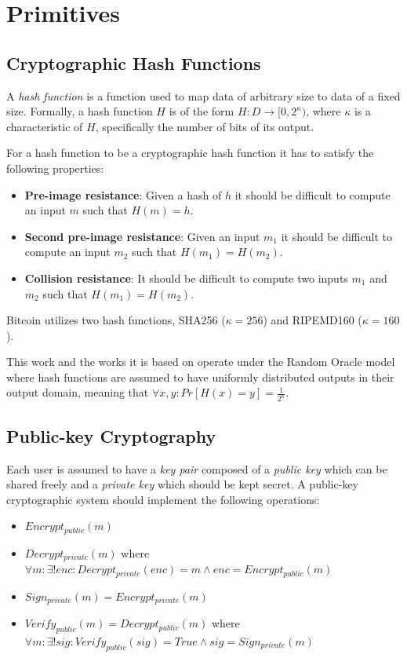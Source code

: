 \section{Primitives}
\subsection{Cryptographic Hash Functions}
A \textit{hash function} is a function used to map data of arbitrary size to data of a fixed size. Formally, a hash function $H$ is of the form $H: D \rightarrow [0, 2^\kappa)$, where $\kappa$ is a characteristic of $H$, specifically the number of bits of its output.

For a hash function to be a cryptographic hash function it has to satisfy the following properties:
\begin{itemize}
  \item \textbf{Pre-image resistance}: Given a hash of $h$ it should be difficult to compute an input $m$ such that $H(m) = h$.
  \item \textbf{Second pre-image resistance}: Given an input $m_1$ it should be difficult to compute an input $m_2$ such that $H(m_1) = H(m_2)$.
  \item \textbf{Collision resistance}: It should be difficult to compute two inputs $m_1$ and $m_2$ such that $H(m_1) = H(m_2)$.
\end{itemize}

Bitcoin utilizes two hash functions, SHA256 ($\kappa=256$) and RIPEMD160 ($\kappa=160$).

This work and the works it is based on \cite{nipopows} operate under the Random Oracle model where hash functions are assumed to have uniformly distributed outputs in their output domain, meaning that $\forall x, y: Pr[H(x) = y] = \frac{1}{2^\kappa}$.

\subsection{Public-key Cryptography}
Each user is assumed to have a \textit{key pair} composed of a \textit{public key} which can be shared freely and a \textit{private key} which should be kept secret. A public-key cryptographic system should implement the following operations:

\begin{itemize}
  \item $Encrypt_{public}(m)$
  \item $Decrypt_{private}(m)$ where $\forall m: \exists! enc: Decrypt_{private}(enc) = m \land enc = Encrypt_{public}(m)$
  \item $Sign_{private}(m) = Encrypt_{private}(m)$
  \item $Verify_{public}(m) = Decrypt_{public}(m)$ where $\forall m: \exists! sig: Verify_{public}(sig) = True \land sig = Sign_{private}(m)$
\end{itemize}

